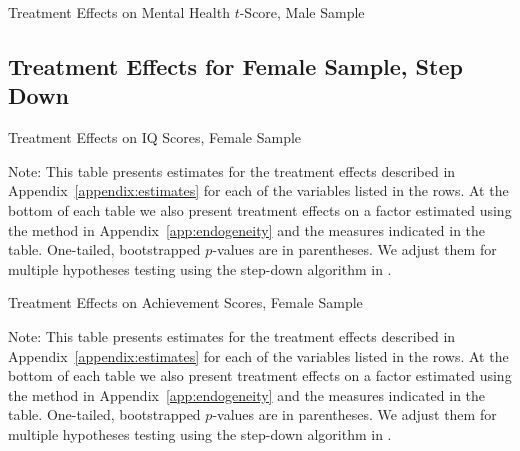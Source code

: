 	\begin{table}[H]
     \caption{Treatment Effects on Mental Health $t$-Score, Male Sample}
     \label{table:abccare_rslt_male_cat15_sd}
	
	\end{table} 
\subsection{Treatment Effects for Female Sample, Step Down}


	\begin{table}[H]
     \caption{Treatment Effects on IQ Scores, Female Sample}
     \label{table:abccare_rslt_female_cat0_sd}
	
	\end{table} 
	\begin{spacing}{1}
\begin{footnotesize}
\noindent Note: This table presents estimates for the treatment effects described in Appendix~\ref{appendix:estimates} for each of the variables listed in the rows. At the bottom of each table we also present treatment effects on a factor estimated using the method in Appendix~\ref{app:endogeneity} and the measures indicated in the table. One-tailed, bootstrapped $p$-values are in parentheses. We adjust them for multiple hypotheses testing using the step-down algorithm in \citet{Romano_Wolf_2016_pval_SaPL}. 
\end{footnotesize}
\end{spacing}


	\begin{table}[H]
     \caption{Treatment Effects on Achievement Scores, Female Sample}
     \label{table:abccare_rslt_female_cat1_sd}
	
	\end{table} 
	\begin{spacing}{1}
\begin{footnotesize}
\noindent Note: This table presents estimates for the treatment effects described in Appendix~\ref{appendix:estimates} for each of the variables listed in the rows. At the bottom of each table we also present treatment effects on a factor estimated using the method in Appendix~\ref{app:endogeneity} and the measures indicated in the table. One-tailed, bootstrapped $p$-values are in parentheses. We adjust them for multiple hypotheses testing using the step-down algorithm in \citet{Romano_Wolf_2016_pval_SaPL}. 
\end{footnotesize}
\end{spacing}


